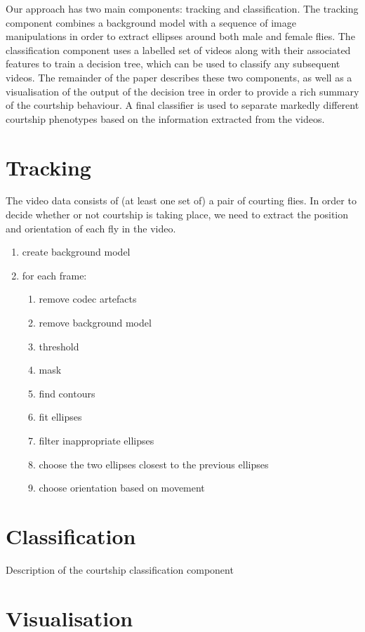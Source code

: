 \documentclass[acmtocl]{acmtrans2m}
\begin{document}
Our approach has two main components: tracking and classification. 
The tracking component combines a background model with a sequence of image manipulations in order to extract ellipses around both male and female flies. 
The classification component uses a labelled set of videos along with their associated features to train a decision tree, which can be used to classify any subsequent videos. 
The remainder of the paper describes these two components, as well as a visualisation of the output of the decision tree in order to provide a rich summary of the courtship behaviour. A final classifier is used to separate markedly different courtship phenotypes based on the information extracted from the videos.

\section{Tracking}

The video data consists of (at least one set of) a pair of courting flies. In order to decide whether or not courtship is taking place, we need to extract the position and orientation of each fly in the video.

\begin{enumerate}
	\item create background model
	\item for each frame:
	\begin{enumerate}
		\item remove codec artefacts
		\item remove background model
		\item threshold
		\item mask
		\item find contours
		\item fit ellipses
		\item filter inappropriate ellipses
		\item choose the two ellipses closest to the previous ellipses
		\item choose orientation based on movement
	\end{enumerate}
\end{enumerate}

\section{Classification}

Description of the courtship classification component

\section{Visualisation}
\end{document}
